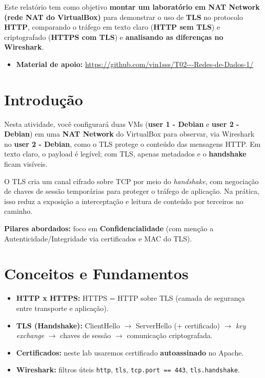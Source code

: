﻿




\tableofcontents
\newpage

\noindent
Este relatório tem como objetivo \textbf{montar um laboratório em NAT Network (rede NAT do VirtualBox)} para demonstrar o uso de \textbf{TLS} no protocolo \textbf{HTTP}, comparando o tráfego em texto claro (\textbf{HTTP sem TLS}) e criptografado (\textbf{HTTPS com TLS}) e \textbf{analisando as diferenças no Wireshark}.

\begin{itemize}
  \item \textbf{Material de apoio:} \url{https://github.com/vin1sss/T02---Redes-de-Dados-1/}
\end{itemize}


\section{Introdução}

Nesta atividade, você configurará duas VMs (\textbf{user 1 - Debian} e \textbf{user 2 - Debian}) em uma \textbf{NAT Network} do VirtualBox para observar, via Wireshark no \textbf{user 2 - Debian}, como o TLS protege o conteúdo das mensagens HTTP. Em texto claro, o payload é legível; com TLS, apenas metadados e o \textbf{handshake} ficam visíveis.

O TLS cria um canal cifrado sobre TCP por meio do \textit{handshake}, com negociação de chaves de sessão temporárias para proteger o tráfego de aplicação. Na prática, isso reduz a exposição a interceptação e leitura de conteúdo por terceiros no caminho.

\textbf{Pilares abordados:} foco em \textbf{Confidencialidade} (com menção a Autenticidade/Integridade via certificados e MAC do TLS).

\section{Conceitos e Fundamentos}

\begin{itemize}
  \item \textbf{HTTP x HTTPS:} HTTPS = HTTP sobre TLS (camada de segurança entre transporte e aplicação).
  \item \textbf{TLS (Handshake):} ClientHello $\rightarrow$ ServerHello (+ certificado) $\rightarrow$ \textit{key exchange} $\rightarrow$ chaves de sessão $\rightarrow$ comunicação criptografada.
  \item \textbf{Certificados:} neste lab usaremos certificado \textbf{autoassinado} no Apache.
  \item \textbf{Wireshark:} filtros úteis \texttt{http}, \texttt{tls}, \texttt{tcp.port == 443}, \texttt{tls.handshake}.
\end{itemize}

